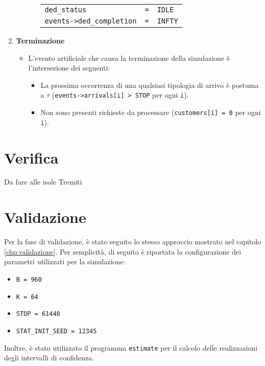 \begin{enumerate}[label=Step \arabic*), align=left, leftmargin=*]
\begin{itemize}
\begin{itemize}
\begin{center}
\begin{tabular}{l l l}
\texttt{ded\_status} & \texttt{=} & \texttt{IDLE} \\
\texttt{events->ded\_completion} & \texttt{=} & \texttt{INFTY}
\end{tabular}
\end{center}
\end{itemize}
\end{itemize}
\item \textbf{Terminazione}
\begin{itemize}
\item L'evento artificiale che causa la terminazione della simulazione è l'intersezione dei seguenti:
\begin{itemize}
\item La prossima occorrenza di una qualsiasi tipologia di arrivo è postuma a $\tau$ (\texttt{events->arrivals[i] > STOP} per ogni \texttt{i}).
\item Non sono presenti richieste da processare (\texttt{customers[i] = 0} per ogni \texttt{i}).
\end{itemize}
\end{itemize}
\end{enumerate}

\section{Verifica}
Da fare alle isole Tremiti

\section{Validazione}
Per la fase di validazione, è stato seguito lo stesso approccio mostrato nel capitolo \ref{chp:validazione}. Per semplicità, di seguito è riportata la configurazione dei parametri utilizzati per la simulazione:
\begin{itemize}
\item \texttt{B = 960}
\item \texttt{K = 64}
\item \texttt{STOP = 61440}
\item \texttt{STAT\_INIT\_SEED = 12345}
\end{itemize}
Inoltre, è stato utilizzato il programma \texttt{estimate} per il calcolo delle realizzazioni degli intervalli di confidenza.

